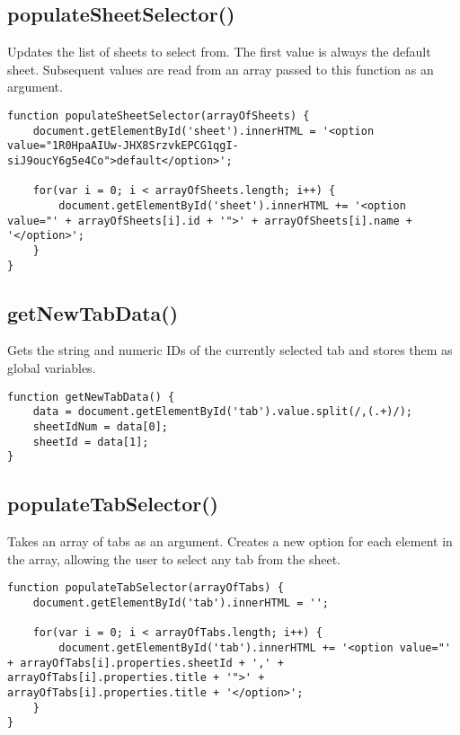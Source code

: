 \documentclass[letterpaper]{article}
\begin{document}
\subsection{populateSheetSelector()}

Updates the list of sheets to select from.
The first value is always the default sheet.
Subsequent values are read from an array passed to this function as an argument.

\begin{lstlisting}[firstnumber=34]
function populateSheetSelector(arrayOfSheets) {
    document.getElementById('sheet').innerHTML = '<option value="1R0HpaAIUw-JHX8SrzvkEPCG1qgI-siJ9oucY6g5e4Co">default</option>';

    for(var i = 0; i < arrayOfSheets.length; i++) {
        document.getElementById('sheet').innerHTML += '<option value="' + arrayOfSheets[i].id + '">' + arrayOfSheets[i].name + '</option>';
    }
}
\end{lstlisting}

\subsection{getNewTabData()}

Gets the string and numeric IDs of the currently selected tab and stores them as global variables.

\begin{lstlisting}[firstnumber=42]
function getNewTabData() {
    data = document.getElementById('tab').value.split(/,(.+)/);
    sheetIdNum = data[0];
    sheetId = data[1];
}
\end{lstlisting}

\subsection{populateTabSelector()}

Takes an array of tabs as an argument.
Creates a new option for each element in the array, allowing the user to select any tab from the sheet.

\begin{lstlisting}[firstnumber=48]
function populateTabSelector(arrayOfTabs) {
    document.getElementById('tab').innerHTML = '';

    for(var i = 0; i < arrayOfTabs.length; i++) {
        document.getElementById('tab').innerHTML += '<option value="' + arrayOfTabs[i].properties.sheetId + ',' + arrayOfTabs[i].properties.title + '">' + arrayOfTabs[i].properties.title + '</option>';
    }
}
\end{lstlisting}
\end{document}
